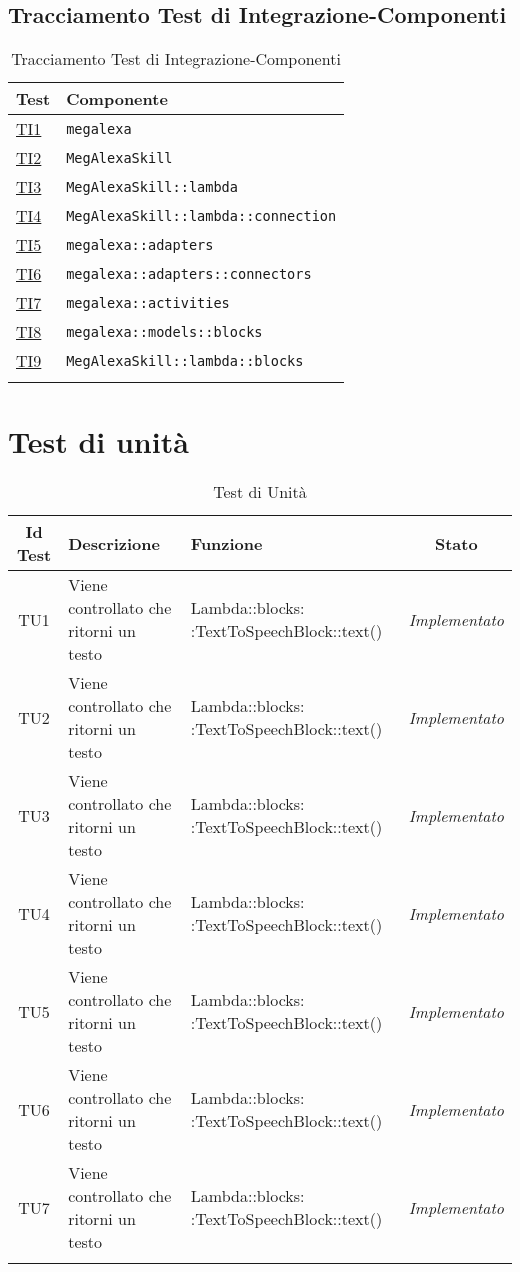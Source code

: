 \subsection{Tracciamento Test di Integrazione-Componenti}
\normalsize
\begin{longtable}{|>{\centering}m{3cm}|m{9cm}<{\centering}|}
\hline
\textbf{Test} & \textbf{Componente}\\
\hline
\endhead
\hyperlink{TI1}{TI1} & \texttt{megalexa}\\ \hline
\hyperlink{TI2}{TI2} & \texttt{MegAlexaSkill}\\ \hline
\hyperlink{TI3}{TI3} & \texttt{MegAlexaSkill::lambda}\\ \hline
\hyperlink{TI4}{TI4} & \texttt{MegAlexaSkill::lambda::connection}\\ \hline
\hyperlink{TI5}{TI5} & \texttt{megalexa::adapters}\\ \hline
\hyperlink{TI6}{TI6} & \texttt{megalexa::adapters::connectors}\\ \hline
\hyperlink{TI7}{TI7} & \texttt{megalexa::activities}\\ \hline
\hyperlink{TI8}{TI8} & \texttt{megalexa::models::blocks}\\ \hline
\hyperlink{TI9}{TI9} & \texttt{MegAlexaSkill::lambda::blocks}\\ \hline
\caption[Tracciamento Test di Integrazione-Componenti]{Tracciamento Test di Integrazione-Componenti}
\label{tabella:ts-requi}
\end{longtable}
\clearpage


\section{Test di unità}

\normalsize
\begin{longtable}{|c|m{9em}|>{}m{9em}|c|}
\hline 
\textbf{Id Test} & \textbf{Descrizione} & \textbf{Funzione} & \textbf{Stato}\\
\hline
\endhead
TU1 & Viene controllato che ritorni un testo & Lambda::blocks: :TextToSpeechBlock::text() & \textit{Implementato}\\ \hline
TU2 & Viene controllato che ritorni un testo & Lambda::blocks: :TextToSpeechBlock::text() & \textit{Implementato}\\ \hline
TU3 & Viene controllato che ritorni un testo & Lambda::blocks: :TextToSpeechBlock::text() & \textit{Implementato}\\ \hline
TU4 & Viene controllato che ritorni un testo & Lambda::blocks: :TextToSpeechBlock::text() & \textit{Implementato}\\ \hline
TU5 & Viene controllato che ritorni un testo & Lambda::blocks: :TextToSpeechBlock::text() & \textit{Implementato}\\ \hline
TU6 & Viene controllato che ritorni un testo & Lambda::blocks: :TextToSpeechBlock::text() & \textit{Implementato}\\ \hline
TU7 & Viene controllato che ritorni un testo & Lambda::blocks: :TextToSpeechBlock::text() & \textit{Implementato}\\ \hline
\caption[Test di Unità]{Test di Unità}
\label{tabella:test2}
\end{longtable}
\clearpage

